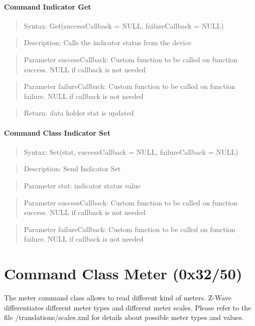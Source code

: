 \paragraph {Command Indicator Get}
\begin{quote} Syntax:  Get(successCallback = NULL, failureCallback = NULL)\end{quote}
\begin{quote} Description: Calls the indicator status from the device\end{quote}
\begin{quote} Parameter successCallback: Custom function to be called on function success. NULL if callback is not needed\end{quote}
\begin{quote} Parameter failureCallback: Custom function to be called on function failure. NULL if callback is not needed\end{quote}
\begin{quote} Return: data holder stat is updated \end{quote} 
 
\paragraph {Command Class Indicator Set}
\begin{quote} Syntax: Set(stat, successCallback = NULL, failureCallback = NULL)\end{quote}
\begin{quote} Description: Send Indicator Set\end{quote}
\begin{quote} Parameter stat: indicator status value\end{quote}
\begin{quote} Parameter successCallback: Custom function to be called on function success. NULL if callback is not needed\end{quote}
\begin{quote} Parameter failureCallback: Custom function to be called on function failure. NULL if callback is not needed\end{quote}

 
\section{Command Class Meter (0x32/50)}

The meter command class allows to read different kind of meters. Z-Wave differentiates different meter types and different 
meter scales. Please refer to the file /translations/scales.xml for details about possible meter types and values.

